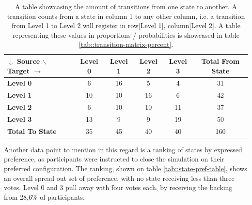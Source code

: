 \begin{table}[!h]
	\begin{center}
		\begin{tabular}{|l|c|c|c|c|c|} 
			\hline
			\bf $\downarrow$ Source $\backslash$ Target $\rightarrow$ & \bf Level 0 & \bf Level 1 & \bf Level 2 & \bf Level 3 & \bf Total From State \\
			\hline
			\bf Level 0 & 6 & 16 & 5 & 4 & 31 \\
			\bf Level 1 & 10 & 10 & 16 & 6 & 42 \\
			\bf Level 2 & 6 & 10 & 10 & 11 & 37 \\
			\bf Level 3 & 13 & 9 & 9 & 19 & 50 \\
			\hline
			\bf Total To State & 35 & 45 & 40 & 40 & 160 \\
			\hline
		\end{tabular}
	\end{center}
	\caption[Numerical State Transition Matrix]{A table showcasing the amount of transitions from one state to another. A transition counts from a state in column 1 to any other column, i.e. a transition from Level 1 to Level 2 will register in row[Level 1], column[Level 2]. A table representing these values in proportions / probabilities is showcased in table \ref{tab::transition-matrix-percent}.}	
	\label{tab::transition-matrix-quant}
\end{table}

Another data point to mention in this regard is a ranking of states by expressed preference, as participants were instructed to close the simulation on their preferred configuration. The ranking, shown on table \ref{tab::state-pref-table}, shows an overall spread out set of preference, with no state receiving less than three votes. Level 0 and 3 pull away with four votes each, by receiving the backing from 28,6\% of participants.\\

